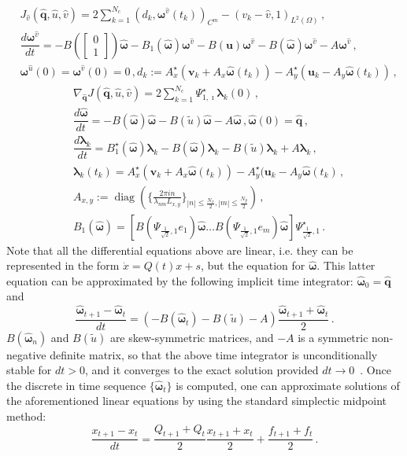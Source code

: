 \documentclass[onecolumn, 12pt, conference]{ieeeconf}
\newcommand{\Lt}{L^2(\Omega)}
\begin{document}
\[
\begin{split}
&J_{\hat v}(\hat{\bm q},\hat u,\hat v)=2\sum_{k=1}^{N_c} (d_k,\bm{\omega}^{\hat v}(t_k))_{C^m} -(v_k - \hat v,1)_{\Lt}\,, \\
&\dfrac{d\bm{\omega}^{\hat v}}{dt} = -B(\left[\begin{smallmatrix}0\\1
\end{smallmatrix}\right])\hat{\bm\omega}-B_1(\hat{\bm\omega})\bm{\omega}^{\hat v} - B(\bm u) \bm{\omega}^{\hat v}- B(\hat{\bm\omega})\bm{\omega}^{\hat v} - A\bm{\omega}^{\hat v}\,,\\
& \bm{\omega}^{\hat u} (0)=\bm{\omega}^{\hat v} (0)=0\,,
d_k:=A_x^\star(\bm{v}_k+A_x\hat{\bm\omega}(t_k)) - A_y^\star(\bm{u}_k-A_y\hat{\bm\omega}(t_k))\,,
\end{split}
\]
\[
\begin{split}
&\nabla_{\hat{\bm q}} J(\hat{\bm q},\hat u,\hat v)=2\sum_{k=1}^{N_c}\Psi_{1,\imath}^\star\bm{\lambda}_k(0)\,,\\
&\dfrac{d\hat{\bm \omega}}{dt} = -B(\hat{\bm \omega})\hat{\bm\omega} - B(\tilde u) \hat{\bm\omega} - A\hat{\bm \omega}\,, \hat{\bm\omega}(0)=\hat{\bm q}\,,
\\
  &\dfrac{d\bm{\lambda}_k}{dt} = B_1^\star(\hat{\bm\omega})\bm{\lambda}_k - B(\hat{\bm\omega})\bm{\lambda}_k - B(\tilde u) \bm{\lambda}_k + A\bm{\lambda}_k\,,\\
& \bm{\lambda}_k(t_k)=A_x^\star(\bm{v}_k + A_x\hat{\bm\omega}(t_k))-A_y^\star (\bm{u}_k - A_y\hat{\bm\omega}(t_k)\,,\\
&A_{x,y}:=\operatorname{diag}(\{\frac{2\pi i n}{\lambda_{nm}L_{x,y}}\}_{|n|\le \frac{N_x}{2},|m|\le\frac{N_y}{2}})\,,\\
&B_1(\hat{\bm\omega}) = [B(\Psi_{\frac1{\sqrt{2}},1} e_1) \hat{\bm\omega}\dots B(\Psi_{\frac1{\sqrt{2}},1} e_{m}) \hat{\bm\omega}]\Psi^\star_{\frac1{\sqrt{2}},1}\,.
\end{split}
\]
Note that all the differential equations above are linear, i.e. they can be represented in the form $\dot x = Q(t)x + s$, but the equation for $\hat{\bm \omega}$. This latter equation can be approximated by the following implicit time integrator: $\hat{\bm \omega}_{0} = \hat{\bm q}$ and
\begin{equation}
  \label{eq:NSE_midpoint}
\frac{\hat{\bm \omega}_{t+1}- \hat{\bm \omega}_{t}}{dt} = \left(-B(\hat{\bm \omega}_t) -B(\tilde u)-A \right) \frac{\hat{\bm \omega}_{t+1}+ \hat{\bm \omega}_{t}}{2}\,.
\end{equation}
$B(\hat{\bm \omega}_n)$ and $B(\tilde u) $ are skew-symmetric matrices, and $-A$ is a symmetric non-negative definite matrix, so that the above time integrator is unconditionally stable for $dt>0$, and it converges to the exact solution provided $dt\to0$~\cite{ZhukTTCDC15}. Once the discrete in time sequence $\{\hat{\bm \omega}_{t}\}$ is computed, one can approximate solutions of the aforementioned linear equations by using the standard simplectic midpoint method: \[
\frac{x_{t+1}- x_{t}}{dt} = \frac{Q_{t+1}+Q_t}{2}\frac{x_{t+1}+ x_{t}}{2}+\frac{f_{t+1}+f_t}2\,.
\]
\end{document}
